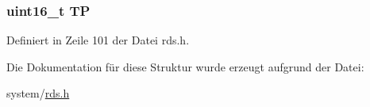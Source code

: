 \subsubsection[{T\+P}]{\setlength{\rightskip}{0pt plus 5cm}uint16\+\_\+t T\+P}\label{structgroup__2b_ab9e634c63b0d95a96716d5f6d7f06d72}


Definiert in Zeile 101 der Datei rds.\+h.



Die Dokumentation für diese Struktur wurde erzeugt aufgrund der Datei\+:\begin{DoxyCompactItemize}
\item 
system/\hyperlink{rds_8h}{rds.\+h}\end{DoxyCompactItemize}
